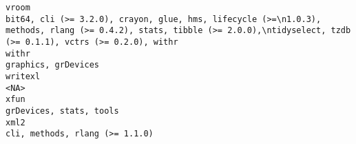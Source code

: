 \documentclass[
  letterpaper,
  DIV=11,
  numbers=noendperiod]{scrreprt}
\begin{document}
\begin{verbatim}
vroom                                                                                                                                                                                                                                                                                                                                                                                                                                          bit64, cli (>= 3.2.0), crayon, glue, hms, lifecycle (>=\n1.0.3), methods, rlang (>= 0.4.2), stats, tibble (>= 2.0.0),\ntidyselect, tzdb (>= 0.1.1), vctrs (>= 0.2.0), withr
withr                                                                                                                                                                                                                                                                                                                                                                                                                                                                                                                                                                                                  graphics, grDevices
writexl                                                                                                                                                                                                                                                                                                                                                                                                                                                                                                                                                                                                               <NA>
xfun                                                                                                                                                                                                                                                                                                                                                                                                                                                                                                                                                                                               grDevices, stats, tools
xml2                                                                                                                                                                                                                                                                                                                                                                                                                                                                                                                                                                                        cli, methods, rlang (>= 1.1.0)

\end{verbatim}
\end{document}
